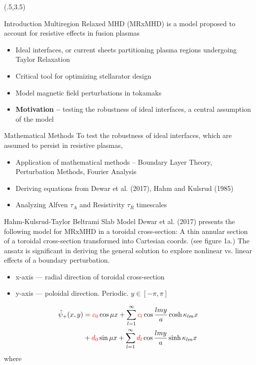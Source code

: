 \documentclass{beamer}
\begin{document}
\begin{frame}[t]
\begin{textblock}{15}(.5,3.5)
\begin{block}{Introduction}
Multiregion Relaxed MHD (MRxMHD) is a model proposed to account for resistive effects in fusion plasmas
\begin{itemize}
    \item Ideal interfaces, or current sheets partitioning plasma regions undergoing Taylor Relaxation 
    \item Critical tool for optimizing stellarator design
    \item Model magnetic field perturbations in tokamaks
    \item {\bf Motivation --} testing the robustness of ideal interfaces, a central assumption of the model 
\end{itemize}
\end{block}

\begin{block}{Mathematical Methods}
To test the robustness of ideal interfaces, which are assumed to persist in resistive plasmas,
\begin{itemize}
    \item Application of mathematical methods -- Boundary Layer Theory, Perturbation Methods, Fourier Analysis
    \item Deriving equations from Dewar et al. (2017), Hahm and Kulsrud (1985)
    \item Analyzing Alfven $\tau_A$ and Resistivity $\tau_R$ timescales \cite{wangbhattacharjee}
\end{itemize}
\end{block}

\begin{block}{Hahm-Kulsrud-Taylor Beltrami Slab Model}
Dewar et al. (2017) presents the following model for MRxMHD in a toroidal cross-section:
A thin annular section of a toroidal cross-section transformed into Cartesian coords. \cite{dewar2017} (see figure 1a.)
The ansatz is significant in deriving the general solution to explore nonlinear vs. linear effects of a boundary perturbation.
\begin{itemize}
    \item x-axis --- radial direction of toroidal cross-section
    \item y-axis --- poloidal direction. Periodic. $y \in [-\pi,\pi]$
\end{itemize}

\begin{equation}
    \begin{split}
        \hat{\psi}_+ (x,y) & = \textcolor{red}{c_0}\cos{\mu x} + \sum_{l=1}^{\infty} \textcolor{red}{c_{l}} \cos{\frac{lmy}{a}} \cosh{\kappa_{lm} x} \\
                           & + \textcolor{red}{d_0} \sin{\mu x} + \sum_{l=1}^{\infty} \textcolor{red}{d_{l}} \cos{\frac{lmy}{a}} \sinh{\kappa_{lm} x}
    \end{split}
\end{equation} 
where


\end{block}
\end{textblock}
\end{frame}
\end{document}
